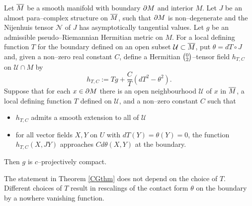 \begin{theo}[\cite{CG}] \label{CGthm}
Let $\overline{M}$ be a smooth manifold with boundary $\partial M$ and interior $M$. Let $J$ be an almost para--complex structure on $\overline{M}$, such that $\partial M$ is non--degenerate and the Nijenhuis tensor $\mathcal{N}$ of $J$ has asymptotically tangential values. Let $g$ be an admissible pseudo--Riemannian Hermitian metric on $M$. For a local defining function $T$ for the boundary defined on an open 
subset ${\mathcal U}\subset \overline{M}$, put $\theta=dT\circ J$ and, given a non--zero real 
constant $C$, define a Hermitian $\big(\negthinspace\begin{smallmatrix}
0 \\ 2
\end{smallmatrix}\negthinspace\big)$--tensor field $h_{T,C}$ on 
${\mathcal U}\cap M$ by
\[
h_{T,C}:=Tg+\frac{C}{T}(dT^2-\theta^2).
\]
Suppose that for each $x\in\partial M$ there is an open neighbourhood 
${\mathcal{U}}$ of $x$ in $\overline{M}$, a local defining function $T$ defined on 
${\mathcal{U}}$, and a non--zero constant $C$ such that
\begin{itemize}
\item $h_{T,C}$ admits a smooth extension to all of $\mathcal{U}$
\item for all vector fields $X,Y$ on $U$ with $dT(Y)=\theta(Y)=0$, the function $h_{T,C}(X,JY)$ approaches $Cd\theta(X,Y)$ at the boundary.
\end{itemize}
Then $g$ is $c$--projectively compact.
\end{theo}
The statement in  Theorem \ref{CGthm} does not depend on the choice of $T$. Different choices of $T$ result in rescalings of the contact form $\theta$ on the boundary by a nowhere vanishing function.
